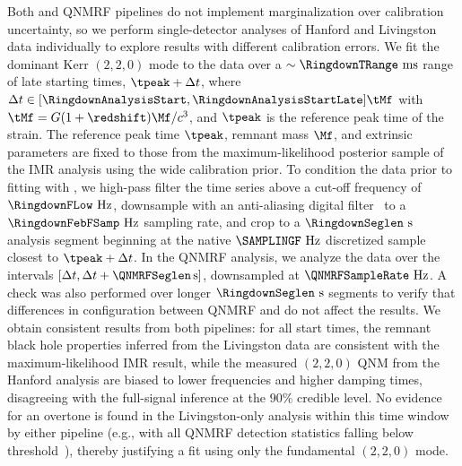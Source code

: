 Both \RINGDOWN{} and  \ac{QNMRF} pipelines do not implement marginalization over calibration uncertainty, so we perform single-detector analyses of Hanford and Livingston data individually to explore results with different calibration errors.
We fit the dominant Kerr $(2,2,0)$ mode to the data over a $\sim \RingdownTRange~\mathrm{ms}$ range of late starting times, $\tpeak + \Delta t$, where $\Delta t \in [\RingdownAnalysisStart, \RingdownAnalysisStartLate] \tMf$ with $\tMf = G(1+\redshift)\Mf/c^3$, and $\tpeak$ is the reference peak time of the strain.
The reference peak time $\tpeak$, remnant mass $\Mf$, and extrinsic parameters are fixed to those from the maximum-likelihood posterior sample of the \SURSEVENDQFOUR \ac{IMR} analysis using the wide calibration prior.
To condition the data prior to fitting with \RINGDOWN{}, we high-pass filter the time series above a cut-off frequency of $\RingdownFLow~\mathrm{Hz}$, downsample with an anti-aliasing digital filter~\cite{Siegel:2024jqd} to a $\RingdownFebFSamp~\mathrm{Hz}$ sampling rate, and crop to a $\RingdownSeglen~\mathrm{s}$ analysis segment beginning at the native $\SAMPLINGF~\mathrm{Hz}$ discretized sample closest to $\tpeak + \Delta t$.
In the \ac{QNMRF} analysis, we analyze the data over the intervals $[\Delta t, \Delta t + \QNMRFSeglen\,{\mathrm{s}}]$, downsampled at $\QNMRFSampleRate~\mathrm{Hz}$.
A check was also performed over longer $\RingdownSeglen~\mathrm{s}$ segments to verify that differences in configuration between \ac{QNMRF} and \RINGDOWN{} do not affect the results.
We obtain consistent results from both pipelines: for all start times, the remnant black hole properties inferred from the Livingston data are consistent with the maximum-likelihood \ac{IMR} result, while the measured $(2,2,0)$ \ac{QNM} from the Hanford analysis are biased to lower frequencies and higher damping times, disagreeing with the full-signal inference at the $90\%$ credible level.
No evidence for an overtone is found in the Livingston-only analysis within this time window by either pipeline (e.g., with all \ac{QNMRF} detection statistics falling below threshold~\cite{Lu:2025mwp}), thereby justifying a fit using only the fundamental $(2,2,0)$ mode.

